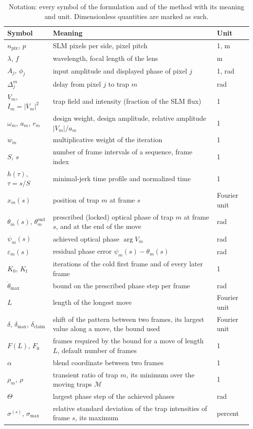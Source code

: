 \begin{table}[t]
\centering\small
\caption{Notation: every symbol of the formulation and of the method with its meaning and unit. Dimensionless quantities are marked as such.}
\label{tab:notation}
\begin{tabular}{@{}l p{8.6cm} l@{}}
\toprule
Symbol & Meaning & Unit\\
\midrule
$n_{\mathrm{pix}}$, $p$ & SLM pixels per side, pixel pitch & 1, m\\
$\lambda$, $f$ & wavelength, focal length of the lens & m\\
$A_j$, $\phi_j$ & input amplitude and displayed phase of pixel $j$ & 1, rad\\
$\Delta_j^m$ & delay from pixel $j$ to trap $m$ & rad\\
$V_m$, $I_m=|V_m|^2$ & trap field and intensity (fraction of the SLM flux) & 1\\
$\omega_m$, $a_m$, $r_m$ & design weight, design amplitude, relative amplitude $|V_m|/a_m$ & 1\\
$w_m$ & multiplicative weight of the iteration & 1\\
$S$, $s$ & number of frame intervals of a sequence, frame index & 1\\
$h(\tau)$, $\tau=s/S$ & minimal-jerk time profile and normalized time & 1\\
$x_m(s)$ & position of trap $m$ at frame $s$ & Fourier unit\\
$\theta_m(s)$, $\theta_m^{\mathrm{end}}$ & prescribed (locked) optical phase of trap $m$ at frame $s$, and at the end of the move & rad\\
$\psi_m(s)$ & achieved optical phase $\arg V_m$ & rad\\
$\varepsilon_m(s)$ & residual phase error $\psi_m(s)-\theta_m(s)$ & rad\\
$K_0$, $K_{\mathrm f}$ & iterations of the cold first frame and of every later frame & 1\\
$\dot\theta_{\max}$ & bound on the prescribed phase step per frame & rad\\
$L$ & length of the longest move & Fourier unit\\
$\delta$, $\delta_{\max}$, $\delta_{\mathrm{claim}}$ & shift of the pattern between two frames, its largest value along a move, the bound used & Fourier unit\\
$F(L)$, $F_0$ & frames required by the bound for a move of length $L$, default number of frames & 1\\
$\alpha$ & blend coordinate between two frames & 1\\
$\rho_m$, $\rho$ & transient ratio of trap $m$, its minimum over the moving traps $\mathcal M$ & 1\\
$\Theta$ & largest phase step of the achieved phases & rad\\
$\sigma^{(s)}$, $\sigma_{\max}$ & relative standard deviation of the trap intensities of frame $s$, its maximum & percent\\
\bottomrule
\end{tabular}
\end{table}
